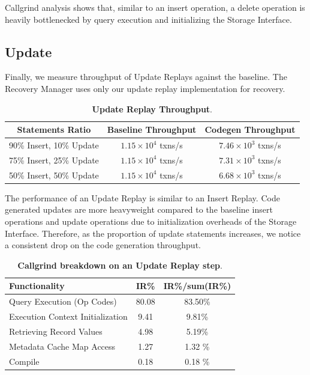 \documentclass[12pt]{cmuthesis}
\begin{document}
Callgrind analysis shows that, similar to an insert operation, a delete operation is heavily bottlenecked by query execution and initializing the Storage Interface.

\subsection{Update}
Finally, we measure throughput of Update Replays against the baseline. The Recovery Manager uses only our update replay implementation for recovery.
\begin{table}[H]
\begin{center}
\begin{tabular}{ c c c } 
 \toprule
\textbf{Statements Ratio} & \textbf{Baseline Throughput} & \textbf{Codegen Throughput}\\ 
 \toprule
 90\% Insert, 10\% Update & $1.15 \times 10^4$ txns/s & $7.46 \times 10^3$ txns/s\\
 \midrule
 75\% Insert, 25\% Update & $1.15 \times 10^4$ txns/s & $7.31 \times 10^3$ txns/s\\
 \midrule
 50\% Insert, 50\% Update & $1.15 \times 10^4$ txns/s & $6.68 \times 10^3$ txns/s \\ 
 \bottomrule
\end{tabular}
\caption{\textbf{Update Replay Throughput}.}
\label{tab:throughput_exp_update}
\end{center}
\end{table}
The performance of an Update Replay is similar to an Insert Replay. Code generated updates are more heavyweight compared to the baseline insert operations and update operations due to initialization overheads of the Storage Interface. Therefore, as the proportion of update statements increases, we notice a consistent drop on the code generation throughput.

\begin{table}[H]
\begin{center}
\begin{tabular}{ l c c } 
 \toprule
 \textbf{Functionality} & \textbf{IR\%} & \textbf{IR\%/sum(IR\%)} \\ 
 \toprule
Query Execution (Op Codes) & 80.08 & 83.50\% \\
 \midrule
 Execution Context Initialization & 9.41 & 9.81\% \\ 
 \midrule
 Retrieving Record Values & 4.98 & 5.19\% \\
 \midrule
 Metadata Cache Map Access & 1.27 & 1.32 \% \\
 \midrule
 Compile & 0.18 & 0.18 \% \\
 \bottomrule
\end{tabular}

\caption{\textbf{Callgrind breakdown on an Update Replay step}.}
\label{tab:throughput_exp_update_overhead_all}
\end{center}
\end{table}
\end{document}
